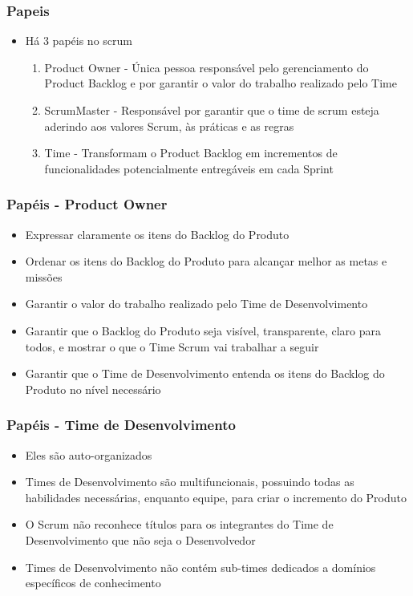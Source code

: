 \begin{frame}
 \frametitle{Papeis}
 \begin{itemize}
  \item Há 3 papéis no scrum
  \begin{enumerate}
   \item Product Owner - Única pessoa responsável pelo gerenciamento do Product Backlog e por garantir o valor do trabalho realizado pelo Time
   \item ScrumMaster - Responsável por garantir que o time de scrum esteja aderindo aos valores Scrum, às práticas e as regras
   \item Time - Transformam o Product Backlog em incrementos de funcionalidades potencialmente entregáveis em cada Sprint
  \end{enumerate}
 \end{itemize}
\end{frame}

\begin{frame}
 \frametitle{Papéis - Product Owner}
 \begin{itemize}
  \item Expressar claramente os itens do Backlog do Produto
  \item Ordenar os itens do Backlog do Produto para alcançar melhor as metas e missões
  \item Garantir o valor do trabalho realizado pelo Time de Desenvolvimento
  \item Garantir que o Backlog do Produto seja visível, transparente, claro para todos, e mostrar o
que o Time Scrum vai trabalhar a seguir
\item Garantir que o Time de Desenvolvimento entenda os itens do Backlog do Produto no nível
necessário
 \end{itemize}
\end{frame}

\begin{frame}
 \frametitle{Papéis - Time de Desenvolvimento}
 \begin{itemize}
  \item Eles são auto-organizados
  \item Times de Desenvolvimento são multifuncionais, possuindo todas as habilidades necessárias,
enquanto equipe, para criar o incremento do Produto
\item O Scrum não reconhece títulos para os integrantes do Time de Desenvolvimento que não
seja o Desenvolvedor
\item Times de Desenvolvimento não contém sub-times dedicados a domínios específicos de
conhecimento
 \end{itemize}
\end{frame}

